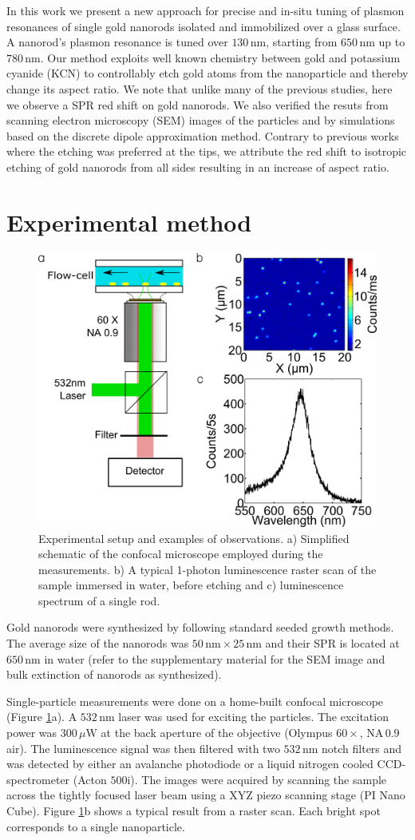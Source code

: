 \documentclass[a4paper,oneside,onecolumn]{article}
\newcommand{\nm}{\ensuremath{\,\textrm{nm}}}
\newcommand{\uW}{\ensuremath{\,\mu\textrm{W}}}
\begin{document}
In this work we present a new approach for precise and in-situ tuning of plasmon
resonances of single gold nanorods isolated and immobilized over a glass
surface. A nanorod's plasmon resonance is tuned over $130\nm$, starting from
$650\nm$ up to $780\nm$. Our method exploits well known chemistry between gold
and potassium cyanide (KCN) to controllably etch gold atoms from the
nanoparticle and thereby change its aspect ratio. We note that unlike many of
the previous studies, here we observe a SPR red shift on gold nanorods. We also verified the resuts from scanning
electron microscopy (SEM) images of the particles and by simulations based on the discrete dipole approximation method. Contrary to previous works where the etching was preferred at the tips, we attribute the red shift to isotropic etching of gold nanorods from all sides resulting in an increase of aspect ratio.

\section{Experimental method}

\begin{figure}[p]
 \centering \includegraphics[width=0.45\linewidth]{Figures/01_Setup/setup_1.png}
 \caption{Experimental setup and examples of observations. a) Simplified
 schematic of the confocal microscope employed during the measurements. b) A
 typical 1-photon luminescence raster scan of the sample immersed in
 water, before etching and c) luminescence spectrum of a single rod.}
 \label{fig:setup}
\end{figure}

Gold nanorods were synthesized by following standard seeded growth
methods\cite{Nikoobakht2003}. The average size of the nanorods was $50\nm\times
25\nm$ and their SPR is located at $650\nm$ in water (refer to the
supplementary material for the SEM image and bulk extinction of nanorods as
synthesized).

Single-particle measurements were done on a home-built confocal microscope
(Figure \ref{fig:setup}a). A $532\nm$ laser was used for exciting the particles.
The excitation power was $300\uW$ at the back aperture of the objective
(Olympus $60\times$, $\textrm{NA}\,0.9$ air). The luminescence signal was then
filtered with two $532\nm$ notch filters and was detected by either an avalanche
photodiode or a liquid nitrogen cooled CCD-spectrometer (Acton $500\textrm{i}$).
The images were acquired by scanning the sample across the tightly focused laser
beam using a XYZ piezo scanning stage (PI Nano Cube). Figure \ref{fig:setup}b shows a typical result from a raster scan. Each bright spot corresponds to a single nanoparticle.
\end{document}
